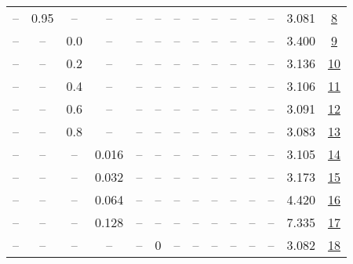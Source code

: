 \begin{table}[H]
\begin{tabular}{cccccccccccccc}
-- & 0.95 & -- & -- & -- & -- & -- & -- & -- & -- & -- & -- & 3.081 & \href{https://wandb.ai/stanford-mercury/optimizer-scaling/runs/sweep-520m-10B-sciona6fcaalr0.008-wd0.1-minlr0-warmup0-b10.95-gn-87ceb2}{8} \\
-- & -- & 0.0 & -- & -- & -- & -- & -- & -- & -- & -- & -- & 3.400 & \href{https://wandb.ai/stanford-mercury/optimizer-scaling/runs/sweep-520m-10B-scion9ad7e2lr0.008-wd0.1-minlr0-warmup0-b10.98-gn-89f482}{9} \\
-- & -- & 0.2 & -- & -- & -- & -- & -- & -- & -- & -- & -- & 3.136 & \href{https://wandb.ai/stanford-mercury/optimizer-scaling/runs/sweep-520m-10B-scion31bf77lr0.008-wd0.1-minlr0-warmup0-b10.98-gn-df286d}{10} \\
-- & -- & 0.4 & -- & -- & -- & -- & -- & -- & -- & -- & -- & 3.106 & \href{https://wandb.ai/stanford-mercury/optimizer-scaling/runs/sweep-520m-10B-scionb32211lr0.008-wd0.1-minlr0-warmup0-b10.98-gn-7512f5}{11} \\
-- & -- & 0.6 & -- & -- & -- & -- & -- & -- & -- & -- & -- & 3.091 & \href{https://wandb.ai/stanford-mercury/optimizer-scaling/runs/sweep-520m-10B-scion8a4cf6lr0.008-wd0.1-minlr0-warmup0-b10.98-gn-6baf62}{12} \\
-- & -- & 0.8 & -- & -- & -- & -- & -- & -- & -- & -- & -- & 3.083 & \href{https://wandb.ai/stanford-mercury/optimizer-scaling/runs/sweep-520m-10B-scion71dd21lr0.008-wd0.1-minlr0-warmup0-b10.98-gn-26a277}{13} \\
-- & -- & -- & 0.016 & -- & -- & -- & -- & -- & -- & -- & -- & 3.105 & \href{https://wandb.ai/stanford-mercury/optimizer-scaling/runs/sweep-520m-10B-scionb6a4a1lr0.016-wd0.1-minlr0-warmup0-b10.98-gn-db98af}{14} \\
-- & -- & -- & 0.032 & -- & -- & -- & -- & -- & -- & -- & -- & 3.173 & \href{https://wandb.ai/stanford-mercury/optimizer-scaling/runs/sweep-520m-10B-scion338c4elr0.032-wd0.1-minlr0-warmup0-b10.98-gn-1dc138}{15} \\
-- & -- & -- & 0.064 & -- & -- & -- & -- & -- & -- & -- & -- & 4.420 & \href{https://wandb.ai/stanford-mercury/optimizer-scaling/runs/sweep-520m-10B-scion901078lr0.064-wd0.1-minlr0-warmup0-b10.98-gn-a88498}{16} \\
-- & -- & -- & 0.128 & -- & -- & -- & -- & -- & -- & -- & -- & 7.335 & \href{https://wandb.ai/stanford-mercury/optimizer-scaling/runs/sweep-520m-10B-scion38a0f0lr0.128-wd0.1-minlr0-warmup0-b10.98-gn-df0a02}{17} \\
-- & -- & -- & -- & -- & 0 & -- & -- & -- & -- & -- & -- & 3.082 & \href{https://wandb.ai/stanford-mercury/optimizer-scaling/runs/sweep-520m-10B-scion4e42fflr0.008-wd0.1-minlr0-warmup0-b10.98-gn-fc4022}{18} \\

\end{tabular}
\end{table}
